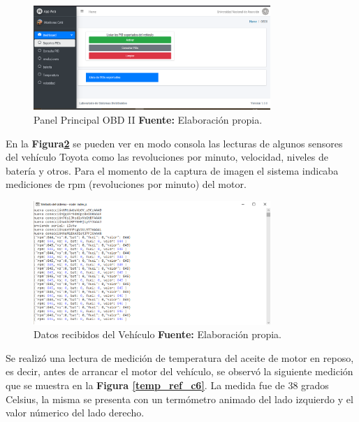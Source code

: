 \begin{figure}[H]
	\centering
	\includegraphics[width=0.8\textwidth]{./Cap6imagen/soportes_fig_c6.png}
	\caption [Panel Principla OBD II.]{Panel Principal OBD II \textbf{ Fuente:} %
		Elaboración propia.}
	\label{panel_ref_c6} %
\end{figure}



En la \textbf{ Figura\ref{consola_ref_c6}} se pueden ver en modo consola las lecturas de algunos sensores del vehículo Toyota como las revoluciones por minuto, velocidad, niveles de batería y otros. Para el momento de la captura de imagen el sistema indicaba mediciones de rpm (revoluciones por minuto) del motor. 

\begin{figure}[H]
	\centering
	\includegraphics[width=0.8\textwidth]{./Cap6imagen/consola_fig_c6.png}
	\caption [Datos recibidos del Vehículo.]{Datos recibidos del Vehículo \textbf{ Fuente:} %
		Elaboración propia.}
	\label{consola_ref_c6} %
\end{figure}


 Se realizó una lectura de medición de temperatura del aceite de motor en reposo, es decir,  antes de arrancar el motor del vehículo, se observó la siguiente medición que se muestra en la \textbf{Figura \ref{temp_ref_c6}}. La medida fue de 38 grados Celsius, la misma se presenta con un termómetro animado del lado izquierdo y el valor númerico del lado derecho.
 

